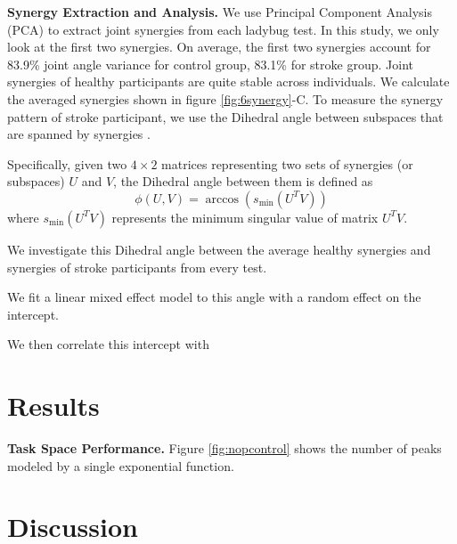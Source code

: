 \textbf{Synergy Extraction and Analysis.}
We use Principal Component Analysis (PCA) to extract joint synergies from each ladybug test. 
In this study, we only look at the first two synergies.
On average, the first two synergies account for 83.9\% joint angle variance for control group, 83.1\% for stroke group.
Joint synergies of healthy participants are quite stable across individuals.
We calculate the averaged synergies shown in figure \ref{fig:6synergy}-C.
To measure the synergy pattern of stroke participant, we use the Dihedral angle between subspaces that are spanned by synergies \cite{}.

Specifically, given two $ 4 \times 2 $ matrices representing two sets of synergies (or subspaces) $ U $ and $ V $, the Dihedral angle between them is defined as
	\begin{equation}\label{eqn:dihedral}
	\phi(U,V) = \arccos(s_\text{min}(U^TV))
	\end{equation}
where $ s_\text{min}(U^TV) $ represents the minimum singular value of matrix $ U^TV $.

We investigate this Dihedral angle between the average healthy synergies and synergies of stroke participants from every test.

We fit a linear mixed effect model to this angle with a random effect on the intercept.

We then correlate this intercept with 


\section{Results}

\textbf{Task Space Performance.}
Figure \ref{fig:nopcontrol} shows the number of peaks modeled by a single exponential function.

\section{Discussion}



